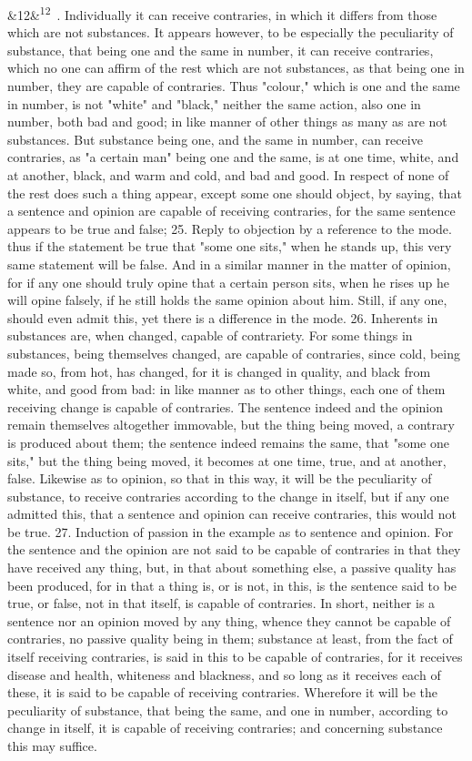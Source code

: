 \documentclass[12pt]{article}
\newcommand{\para}[1][]{\par\noindent\ifx&#1&\else\textsuperscript{\footnotesize #1}~\fi}
\begin{document}
\para[12] 24. Individually it can receive contraries, in which it differs from those which are not substances. It appears however, to be especially the peculiarity of substance, that being one and the same in number, it can receive contraries, which no one can affirm of the rest which are not substances, as that being one in number, they are capable of contraries. Thus "colour," which is one and the same in number, is not "white" and "black," neither the same action, also one in number, both bad and good; in like manner of other things as many as are not substances. But substance being one, and the same in number, can receive contraries, as "a certain man" being one and the same, is at one time, white, and at another, black, and warm and cold, and bad and good. In respect of none of the rest does such a thing appear, except some one should object, by saying, that a sentence and opinion are capable of receiving contraries, for the same sentence appears to be true and false; 25. Reply to objection by a reference to the mode. thus if the statement be true that "some one sits," when he stands up, this very same statement will be false. And in a similar manner in the matter of opinion, for if any one should truly opine that a certain person sits, when he rises up he will opine falsely, if he still holds the same opinion about him. Still, if any one, should even admit this, yet there is a difference in the mode. 26. Inherents in substances are, when changed, capable of contrariety. For some things in substances, being themselves changed, are capable of contraries, since cold, being made so, from hot, has changed, for it is changed in quality, and black from white, and good from bad: in like manner as to other things, each one of them receiving change is capable of contraries. The sentence indeed and the opinion remain themselves altogether immovable, but the thing being moved, a contrary is produced about them; the sentence indeed remains the same, that "some one sits," but the thing being moved, it becomes at one time, true, and at another, false. Likewise as to opinion, so that in this way, it will be the peculiarity of substance, to receive contraries according to the change in itself, but if any one admitted this, that a sentence and opinion can receive contraries, this would not be true. 27. Induction of passion in the example as to sentence and opinion. For the sentence and the opinion are not said to be capable of contraries in that they have received any thing, but, in that about something else, a passive quality has been produced, for in that a thing is, or is not, in this, is the sentence said to be true, or false, not in that itself, is capable of contraries. In short, neither is a sentence nor an opinion moved by any thing, whence they cannot be capable of contraries, no passive quality being in them; substance at least, from the fact of itself receiving contraries, is said in this to be capable of contraries, for it receives disease and health, whiteness and blackness, and so long as it receives each of these, it is said to be capable of receiving contraries. Wherefore it will be the peculiarity of substance, that being the same, and one in number, according to change in itself, it is capable of receiving contraries; and concerning substance this may suffice.
\end{document}
